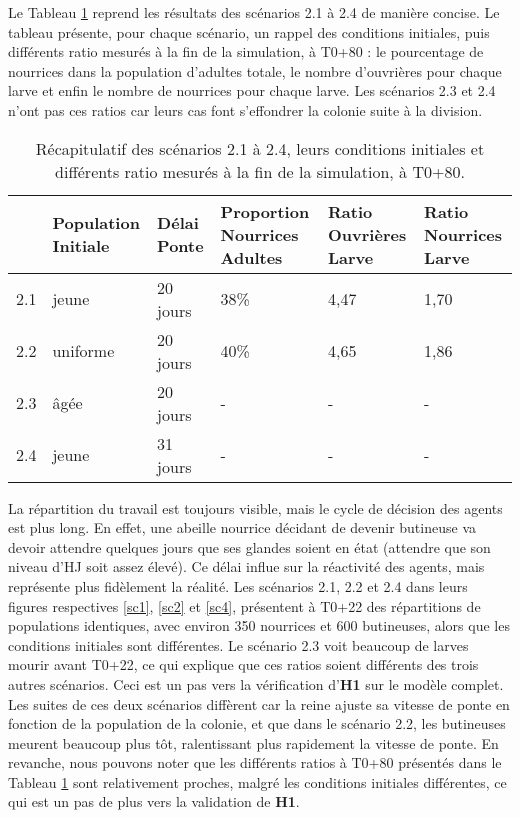 		Le Tableau \ref{TabComplet} reprend les résultats des scénarios 2.1 à 2.4 de manière concise. Le tableau présente, pour chaque scénario, un rappel des conditions initiales, puis différents ratio mesurés à la fin de la simulation, à T0+80 : le pourcentage de nourrices dans la population d'adultes totale, le nombre d'ouvrières pour chaque larve et enfin le nombre de nourrices pour chaque larve. Les scénarios 2.3 et 2.4 n'ont pas ces ratios car leurs cas font s'effondrer la colonie suite à la division.
		\begin{table}
		\centering
		\begin{tabularx}{\textwidth}{l|p{2cm}|p{1.5cm}|X|X|X}
    	& Population \newline Initiale & Délai Ponte & Proportion Nourrices Adultes & Ratio Ouvrières Larve & Ratio Nourrices Larve \\
   		\hline
   		2.1 & jeune & 20 jours & 38\% & 4,47 & 1,70 \\
   		2.2 & uniforme & 20 jours & 40\% & 4,65 & 1,86 \\
   		2.3 & âgée & 20 jours &-&-&-\\
   		2.4 & jeune & 31 jours &-&-&-\\
		\end{tabularx}	
		\caption{Récapitulatif des scénarios 2.1 à 2.4, leurs conditions initiales et différents ratio mesurés à la fin de la simulation, à T0+80.}	
   		\label{TabComplet}
	\end{table}	
		
		
		La répartition du travail est toujours visible, mais le cycle de décision des agents est plus long. En effet, une abeille nourrice décidant de devenir butineuse va devoir attendre quelques jours que ses glandes soient en état (attendre que son niveau d'HJ soit assez élevé). Ce délai influe sur la réactivité des agents, mais représente plus fidèlement la réalité. Les scénarios 2.1, 2.2 et 2.4 dans leurs figures respectives \ref{sc1}, \ref{sc2} et \ref{sc4}, présentent à T0+22 des répartitions de populations identiques, avec environ 350 nourrices et 600 butineuses, alors que les conditions initiales sont différentes. Le scénario 2.3 voit beaucoup de larves mourir avant T0+22, ce qui explique que ces ratios soient différents des trois autres scénarios. Ceci est un pas vers la vérification d'\textbf{H1} sur le modèle complet. Les suites de ces deux scénarios diffèrent car la reine ajuste sa vitesse de ponte en fonction de la population de la colonie, et que dans le scénario 2.2, les butineuses meurent beaucoup plus tôt, ralentissant plus rapidement la vitesse de ponte. En revanche, nous pouvons noter que les différents ratios à T0+80 présentés dans le Tableau \ref{TabComplet} sont relativement proches, malgré les conditions initiales différentes, ce qui est un pas de plus vers la validation de \textbf{H1}.
		
